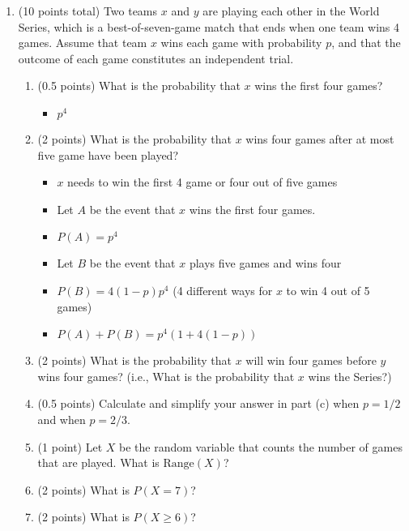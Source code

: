 \documentclass[11pt]{article}
\newcommand{\Range}{{\mathrm{Range}}}
\begin{document}
\begin{enumerate}

\item (10 points total) Two teams $x$ and $y$ are playing each other in the
World Series, which is a best-of-seven-game match that ends when one
team wins 4 games.  Assume that team $x$ wins each game with probability
$p$, and that the outcome of each game constitutes an independent trial.

\begin{enumerate}
\item (0.5 points) What is the probability that $x$ wins the first four games?

\begin{itemize}
	\item $p^{4}$
\end{itemize}

\item (2 points) What is the probability that $x$ wins four games after
at most five game have been played?
\begin{itemize}
	\item $x$ needs to win the first 4 game or four out of five games
	\item Let $A$ be the event that $x$ wins the first four games.
	\item $P(A) = p^{4}$
	\item Let $B$ be the event that $x$ plays five games and wins four
	\item $P(B) = 4(1-p)p^{4}$ (4 different ways for $x$ to win 4 out of 5 games)
	\item $P(A) + P(B) = p^{4}(1 + 4(1-p))$
\end{itemize}

\item (2 points) What is the probability that $x$ will win four games before
$y$ wins four games?  (i.e., What is the probability that $x$ wins
the Series?)

\item (0.5 points) Calculate and simplify your answer in part (c) when $p=1/2$
and when $p=2/3$.

\item (1 point) Let $X$ be the random variable that counts the number of games
that are played.  What is $\Range(X)$?

\item (2 points) What is $P(X=7)$?

\item (2 points) What is $P(X\geq 6)$?
\end{enumerate}


\end{enumerate}
\end{document}

